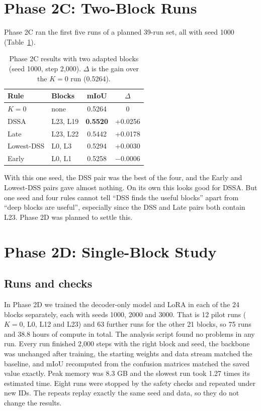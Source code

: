 \documentclass[11pt,a4paper]{report}
\begin{document}
\section{Phase 2C: Two-Block Runs}

Phase 2C ran the first five runs of a planned 39-run set, all with seed 1000 (Table~\ref{tab:k2}).

\begin{table}[t]
\centering
\caption{Phase 2C results with two adapted blocks (seed 1000, step 2,000). $\Delta$ is the gain over the $K = 0$ run (0.5264).}
\label{tab:k2}
\small
\begin{tabular}{@{}llcc@{}}
\toprule
\textbf{Rule} & \textbf{Blocks} & \textbf{mIoU} & \textbf{$\Delta$} \\
\midrule
$K = 0$ & none & 0.5264 & 0 \\
DSSA & L23, L19 & \textbf{0.5520} & +0.0256 \\
Late & L23, L22 & 0.5442 & +0.0178 \\
Lowest-DSS & L0, L3 & 0.5294 & +0.0030 \\
Early & L0, L1 & 0.5258 & $-0.0006$ \\
\bottomrule
\end{tabular}
\end{table}

With this one seed, the DSS pair was the best of the four, and the Early and Lowest-DSS pairs gave almost nothing. On its own this looks good for DSSA. But one seed and four rules cannot tell ``DSS finds the useful blocks'' apart from ``deep blocks are useful'', especially since the DSS and Late pairs both contain L23. Phase 2D was planned to settle this.

\section{Phase 2D: Single-Block Study}

\subsection{Runs and checks}

In Phase 2D we trained the decoder-only model and LoRA in each of the 24 blocks separately, each with seeds 1000, 2000 and 3000. That is 12 pilot runs ($K = 0$, L0, L12 and L23) and 63 further runs for the other 21 blocks, so 75 runs and 38.8 hours of compute in total. The analysis script found no problems in any run. Every run finished 2,000 steps with the right block and seed, the backbone was unchanged after training, the starting weights and data stream matched the baseline, and mIoU recomputed from the confusion matrices matched the saved value exactly. Peak memory was 8.3 GB and the slowest run took 1.27 times its estimated time. Eight runs were stopped by the safety checks and repeated under new IDs. The repeats replay exactly the same seed and data, so they do not change the results.
\end{document}
